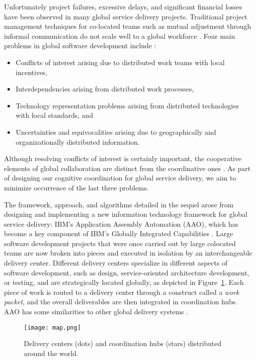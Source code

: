 \documentclass[10pt,journal,cspaper,compsoc]{IEEEtran}
\begin{document}
Unfortunately project failures, excessive delays, and significant financial losses have been observed in many global 
service delivery projects. Traditional project management techniques for co-located teams such as 
mutual adjustment through informal communication \cite{Mintzberg1989} do not scale well to a global workforce 
\cite{Gumm2006}. Four main problems in global software development include \cite{Wiredu2006}:
\begin{itemize}
  \item Conflicts of interest arising due to distributed work teams with local incentives,
  \item Interdependencies arising from distributed work processes,
  \item Technology representation problems arising from distributed technologies with local standards, and
  \item Uncertainties and equivocalities arising due to geographically and organizationally distributed information.
\end{itemize}
Although resolving conflicts of interest is certainly important, the cooperative elements of global collaboration 
are distinct from the coordinative ones \cite{GulatiWZ2012}.  As part of designing our cognitive coordination 
for global service delivery, we aim to minimize occurrence of the last three problems.

The framework, approach, and algorithms detailed in the sequel arose from designing and implementing a new 
information technology framework for global service delivery: IBM's Application Assembly Automation (AAO), 
which has become a key component of IBM's Globally Integrated Capabilities \cite{IBM2009}. Large software 
development projects that were once carried out by large colocated teams are now 
broken into pieces and executed in isolation by an interchangeable delivery center.  Different delivery centers 
specialize in different aspects of software development, such as design, service-oriented architecture development, 
or testing, and are strategically located globally, as depicted in Figure~\ref{fig:map}. Each piece of work is 
routed to a delivery center through a construct called a \emph{work packet}, and the overall deliverables are 
then integrated in coordination hubs.  AAO has some similarities to other global delivery systems \cite{UptonF2005}.

\begin{figure}
  \centering
  \texttt{[image: map.png]}
  \caption{Delivery centers (dots) and coordination hubs (stars) distributed around the world.}
  \label{fig:map}
\end{figure}
\end{document}
